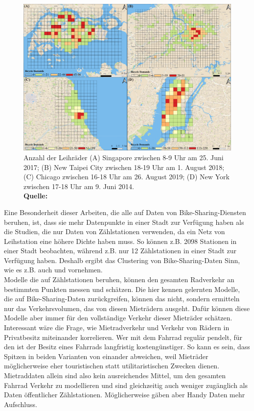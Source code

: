 \documentclass[a4paper,12pt]{thesis}
\newcommand*{\captionsource}[2]{%
	\caption[{#1}]{%
		#1%
		\\\hspace{\linewidth}%
		\textbf{Quelle:} #2%
	}%
}
\begin{document}
\begin{figure}[!ht]
	\centering
	\includegraphics[width=\textwidth]{Plots/Li2022.png}
	\captionsource{Anzahl der Leihräder (A) Singapore zwischen 8-9 Uhr am 25. Juni 2017; (B) New Taipei City zwischen 18-19 Uhr am 1. August 2018; (C) Chicago zwischen 16-18 Uhr am 26. August 2019; (D) New York zwischen 17-18 Uhr am 9. Juni 2014.}{
		\cite{Li2022}
	}
	\label{LiBild}
\end{figure}
Eine Besonderheit dieser Arbeiten, die alle auf Daten von Bike-Sharing-Diensten beruhen, ist, dass sie mehr Datenpunkte in einer Stadt zur Verfügung haben als die Studien, die nur Daten von Zählstationen verwenden, da ein Netz von Leihstation eine höhere Dichte haben muss. So können \cite{Gao2022} z.B. 2098 Stationen in einer Stadt beobachten, während \cite{Broucke2019} z.B. nur 12 Zählstationen in einer Stadt zur Verfügung haben. Deshalb ergibt das Clustering von Bike-Sharing-Daten Sinn, wie es z.B. auch \cite{Xu2013} und \cite{Li2015} vornehmen.\\
Modelle die auf Zählstationen beruhen, können den gesamten Radverkehr an bestimmten Punkten messen und schätzen. Die hier kennen gelernten Modelle, die auf Bike-Sharing-Daten zurückgreifen, können das nicht, sondern ermitteln nur das Verkehrsvolumen, das von diesen Mieträdern ausgeht. Dafür können diese Modelle aber immer für den vollständige Verkehr dieser Mieträder schätzen. Interessant wäre die Frage, wie Mietradverkehr und Verkehr von Rädern in Privatbesitz miteinander korrelieren. Wer mit dem Fahrrad regulär pendelt, für den ist der Besitz eines Fahrrads langfristig kostengünstiger. So kann es sein, dass Spitzen in beiden Varianten von einander abweichen, weil Mieträder möglicherweise eher touristischen statt utilitaristischen Zwecken dienen. Mietraddaten allein sind also kein ausreichendes Mittel, um den gesamten Fahrrad Verkehr zu modellieren und sind gleichzeitig auch weniger zugänglich als Daten öffentlicher Zählstationen. Möglicherweise gäben aber Handy Daten mehr Aufschluss.
\end{document}
